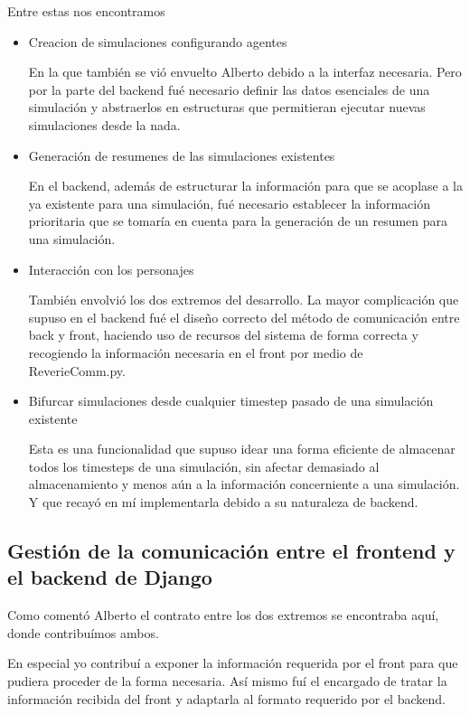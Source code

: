 Entre estas nos encontramos 
\begin{itemize}
    \item Creacion de simulaciones configurando agentes

En la que también se vió envuelto Alberto debido a la interfaz necesaria. Pero por la parte del backend fué necesario definir las datos esenciales de una simulación y abstraerlos en estructuras que permitieran ejecutar nuevas simulaciones desde la nada.

    \item Generación de resumenes de las simulaciones existentes

En el backend, además de estructurar la información para que se acoplase a la ya existente para una simulación, fué necesario establecer la información prioritaria que se tomaría en cuenta para la generación de un resumen para una simulación.

    \item Interacción con los personajes

También envolvió los dos extremos del desarrollo. La mayor complicación que supuso en el backend fué el diseño correcto del método de comunicación entre back y front, haciendo uso de recursos del sistema de forma correcta y recogiendo la información necesaria en el front por medio de ReverieComm.py.

    \item Bifurcar simulaciones desde cualquier timestep pasado de una simulación existente

Esta es una funcionalidad que supuso idear una forma eficiente de almacenar todos los timesteps de una simulación, sin afectar demasiado al almacenamiento y menos aún a la información concerniente a una simulación. Y que recayó en mí implementarla debido a su naturaleza de backend.

\end{itemize}

\subsection*{Gestión de la comunicación entre el frontend y el backend de Django}

Como comentó Alberto el contrato entre los dos extremos se encontraba aquí, donde contribuímos ambos.

En especial yo contribuí a exponer la información requerida por el front para que pudiera proceder de la forma necesaria. Así mismo fuí el encargado de tratar la información recibida del front y adaptarla al formato requerido por el backend.